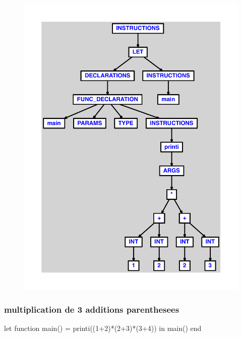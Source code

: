 \documentclass{article}
\begin{document}
\begin{figure}[H]\centering\includegraphics[max width=\textwidth]{ast/ast_103.pdf}\end{figure}\subsubsection{multiplication de 3 additions parenthesees}
\begin{verbatimtab}
let function main() = printi((1+2)*(2+3)*(3+4)) in main() end
\end{verbatimtab}
\end{document}
